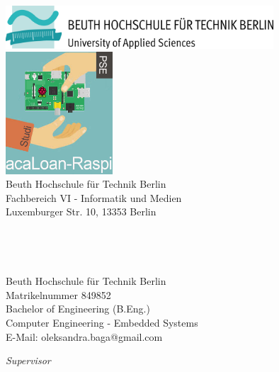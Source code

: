 \begin{titlepage}
	\tgherosfont
	\centering

	\includegraphics[width=10cm]{gfx/Beuth-Logo_horizontal} \\[8mm]
	\includegraphics[width=4cm]{gfx/csm_acaLoan-Raspi} \\[0mm]

    {\normalsize Beuth Hochschule für Technik Berlin}\\
    {\normalsize Fachbereich VI  - Informatik und Medien}\\
    {\normalsize Luxemburger Str. 10, 13353 Berlin}\\[10mm]

	{\LARGE \color{ctcolortitle}\textbf{\thesisTitle}}\\[5mm]
	{\color{ctcolortitle}\textbf{\thesisTitleEng}}\\[10mm]
	{\LARGE \color{ctcolortitle}\textbf{\thesisTitleDe}}\\[10mm]
	
	{\LARGE \thesisName} \\[5mm]
	    {\normalsize Beuth Hochschule für Technik Berlin} \\
    {\normalsize Matrikelnummer 849852} \\
	{\normalsize Bachelor of Engineering (B.Eng.)} \\
	{\normalsize Computer Engineering -  Embedded Systems} \\


	{\small E-Mail: oleksandra.baga@gmail.com} \\

	\vfill
	\begin{minipage}[t]{.27\textwidth}
		\raggedleft
		\textit{Supervisor}
	\end{minipage}
	\hspace*{15pt}
	\begin{minipage}[t]{.65\textwidth}
		{\large \thesisFirstReviewer} \\
	  	{\small \thesisFirstReviewerDepartment} \\[-1mm]
		{\small \thesisFirstReviewerUniversity}
	\end{minipage} \\[5mm]
	\thesisDate \\
\end{titlepage}